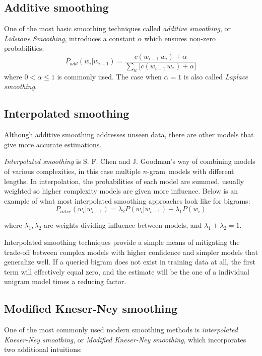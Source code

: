 \documentclass[a4paper,11pt]{kth-mag}
\newcommand{\ngram}{$n$-gram}
\begin{document}
\subsection{Additive smoothing}
One of the most basic smoothing techniques called \emph{additive smoothing},
or \emph{Lidstone Smoothing}, introduces a constant $\alpha$ which ensures
non-zero probabilities\cite{chen_goodman}:
\begin{equation} \label{eq:additive_smoothing}
P_{add}(w_i|w_{i-1}) = \frac{c(w_{i-1}\,w_i)+\alpha}{\sum_{w} \big[c(w_{i-1}\, w_*)+\alpha\big]}
\end{equation}
where $0 < \alpha \leq 1$ is commonly used. The case when $\alpha=1$ is also called \emph{Laplace smoothing}\cite{nlp_book}.


\subsection{Interpolated smoothing}
Although additive smoothing addresses unseen data, there are other models that give more accurate estimations.

\emph{Interpolated smoothing} is S. F. Chen and J. Goodman's way of combining models of various complexities,
in this case multiple \ngram~models with different lengths. In interpolation, the probabilities of each model are summed, usually weighted so higher complexity models are given more influence\cite{chen_goodman}.
Below is an example of what most interpolated smoothing approaches look like for bigrams:
\begin{equation}\label{eq:interpolated_smoothing}
  P_{inter}(w_i|w_{i-1}) =
  \lambda_2 P(w_i|w_{i-1}) + \lambda_1 P(w_i)
\end{equation}

where $\lambda_1, \lambda_2$ are weights dividing influence between models, and $\lambda_1 + \lambda_2 = 1$.

Interpolated smoothing techniques provide a simple means of mitigating
the trade-off between complex models with higher confidence
and simpler models that generalize well.
If a queried bigram does not exist in training data at all,
the first term will effectively equal zero,
and the estimate will be the one of a individual unigram model times a reducing factor.

\subsection{Modified Kneser-Ney smoothing}
One of the most commonly used modern smoothing methods is \emph{interpolated Kneser-Ney smoothing},
or \emph{Modified Kneser-Ney smoothing}\cite{nlp_book}, which incorporates two additional intuitions:
\end{document}
